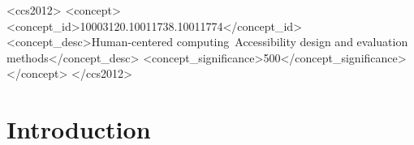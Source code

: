 \documentclass[sigconf]{acmart}
\begin{document}
\begin{CCSXML}
<ccs2012>
  <concept>
      <concept_id>10003120.10011738.10011774</concept_id>
      <concept_desc>Human-centered computing~Accessibility design and evaluation methods</concept_desc>
      <concept_significance>500</concept_significance>
      </concept>
</ccs2012>
\end{CCSXML}




\maketitle

\setlength{\parskip}{-0.1pt}

\hypertarget{introduction}{%
\section{Introduction}\label{introduction}}
\end{document}
